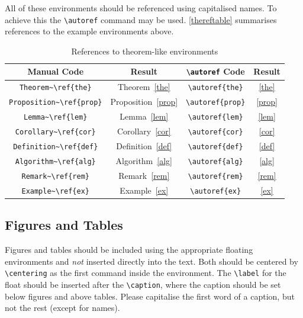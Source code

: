 \documentclass{eceasst}
\begin{document}
All of these environments should be referenced using capitalised names.
To achieve this the \verb|\autoref| command may be used.
\autoref{thereftable} summarises references to the example environments above.
\begin{table}
\centering
\caption{References to theorem-like environments}\label{thereftable}
\begin{tabular}{|c|c|c|c|}
\hline
\textbf{Manual Code} & \textbf{Result} &
\verb|\autoref| \textbf{Code} & \textbf{Result} \\\hline
\verb|Theorem~\ref{the}| & Theorem~\ref{the} &
\verb|\autoref{the}| & \autoref{the} \\\hline
\verb|Proposition~\ref{prop}| & Proposition~\ref{prop} &
\verb|\autoref{prop}| & \autoref{prop} \\\hline
\verb|Lemma~\ref{lem}| & Lemma~\ref{lem} &
\verb|\autoref{lem}| & \autoref{lem} \\\hline
\verb|Corollary~\ref{cor}| & Corollary~\ref{cor} &
\verb|\autoref{cor}| & \autoref{cor} \\\hline
\verb|Definition~\ref{def}| & Definition~\ref{def} &
\verb|\autoref{def}| & \autoref{def} \\\hline
\verb|Algorithm~\ref{alg}| & Algorithm~\ref{alg} &
\verb|\autoref{alg}| & \autoref{alg} \\\hline
\verb|Remark~\ref{rem}| & Remark~\ref{rem} &
\verb|\autoref{rem}| & \autoref{rem} \\\hline
\verb|Example~\ref{ex}| & Example~\ref{ex} &
\verb|\autoref{ex}| & \autoref{ex} \\\hline
\end{tabular}
\end{table}

\subsection{Figures and Tables}\label{figures}
Figures and tables should be included using the appropriate floating
environments and \emph{not} inserted directly into the text.
Both should be centered by \verb|\centering| as the first command inside the
environment.
The \verb|\label| for the float should be inserted after the \verb|\caption|,
where the caption should be set below figures and above tables.
Please capitalise the first word of a caption, but not the rest (except for
names).
\end{document}
